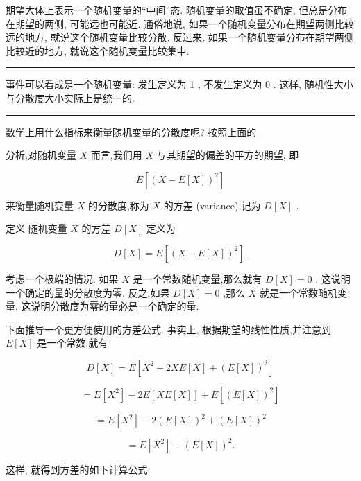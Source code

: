 \documentclass[10pt]{article}
\newcommand{\HRule}{\begin{center}\rule{0.9\linewidth}{0.2mm}\end{center}}
\begin{document}
期望大体上表示一个随机变量的“中间”态. 随机变量的取值虽不确定, 但总是分布在期望的两侧, 可能远也可能近. 通俗地说, 如果一个随机变量分布在期望两侧比较远的地方, 就说这个随机变量比较分散. 反过来, 如果一个随机变量分布在期望两侧比较近的地方, 就说这个随机变量比较集中.

\HRule

事件可以看成是一个随机变量: 发生定义为 1 , 不发生定义为 0 . 这样, 随机性大小与分散度大小实际上是统一的.

\HRule

数学上用什么指标来衡量随机变量的分散度呢? 按照上面的



分析,对随机变量 \(X\) 而言,我们用 \(X\) 与其期望的偏差的平方的期望, 即

\[
E\left\lbrack  {\left( X - E\left\lbrack  X\right\rbrack  \right) }^{2}\right\rbrack
\]

来衡量随机变量 \(X\) 的分散度,称为 \(X\) 的方差 (variance),记为 \(D\left\lbrack  X\right\rbrack\) .

定义 随机变量 \(X\) 的方差 \(D\left\lbrack  X\right\rbrack\) 定义为

\[
D\left\lbrack  X\right\rbrack   = E\left\lbrack  {\left( X - E\left\lbrack  X\right\rbrack  \right) }^{2}\right\rbrack  .
\]

考虑一个极端的情况. 如果 \(X\) 是一个常数随机变量,那么就有 \(D\left\lbrack  X\right\rbrack   = 0\) . 这说明一个确定的量的分散度为零. 反之,如果 \(D\left\lbrack  X\right\rbrack   = 0\) ,那么 \(X\) 就是一个常数随机变量. 这说明分散度为零的量必是一个确定的量.

下面推导一个更方便使用的方差公式. 事实上, 根据期望的线性性质,并注意到 \(E\left\lbrack  X\right\rbrack\) 是一个常数,就有

\[
D\left\lbrack  X\right\rbrack   = E\left\lbrack  {{X}^{2} - {2XE}\left\lbrack  X\right\rbrack   + {\left( E\left\lbrack  X\right\rbrack  \right) }^{2}}\right\rbrack
\]

\[
= E\left\lbrack  {X}^{2}\right\rbrack   - {2E}\left\lbrack  {{XE}\left\lbrack  X\right\rbrack  }\right\rbrack   + E\left\lbrack  {\left( E\left\lbrack  X\right\rbrack  \right) }^{2}\right\rbrack
\]

\[
= E\left\lbrack  {X}^{2}\right\rbrack   - 2{\left( E\left\lbrack  X\right\rbrack  \right) }^{2} + {\left( E\left\lbrack  X\right\rbrack  \right) }^{2}
\]

\[
= E\left\lbrack  {X}^{2}\right\rbrack   - {\left( E\left\lbrack  X\right\rbrack  \right) }^{2}.
\]

这样, 就得到方差的如下计算公式:
\end{document}
